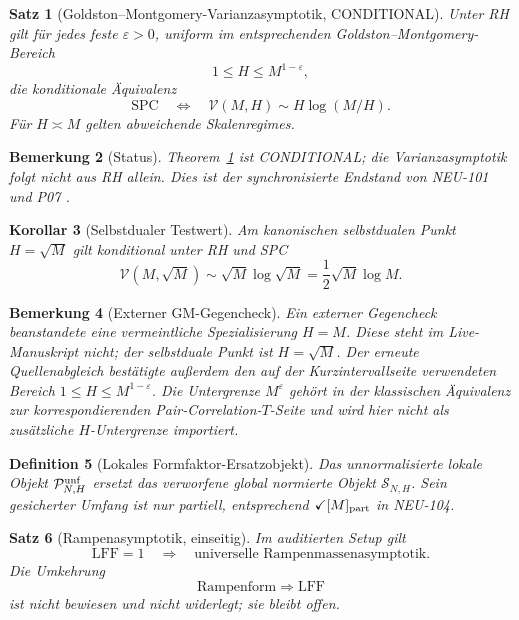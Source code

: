 \documentclass[11pt,a4paper]{amsart}
\newtheorem{theorem}{Satz}[section]
\newtheorem{corollary}[theorem]{Korollar}
\newtheorem{definition}[theorem]{Definition}
\newtheorem{remark}[theorem]{Bemerkung}
\newcommand{\SPC}{\mathrm{SPC}}
\newcommand{\LFF}{\mathrm{LFF}}
\begin{document}
\begin{theorem}[Goldston--Montgomery-Varianzasymptotik, CONDITIONAL]
\label{thm:gm}
Unter RH gilt für jedes feste $\varepsilon>0$, uniform im entsprechenden
Goldston--Montgomery-Bereich
\[
  1\le H\le M^{1-\varepsilon},
\]
die konditionale Äquivalenz
\[
  \SPC
  \quad\Longleftrightarrow\quad
  \mathcal V(M,H)\sim H\log(M/H).
\]
Für $H\asymp M$ gelten abweichende Skalenregimes.
\end{theorem}

\begin{remark}[Status]
Theorem~\ref{thm:gm} ist \emph{CONDITIONAL}; die Varianzasymptotik folgt nicht
aus RH allein. Dies ist der synchronisierte Endstand von NEU-101 und P07
\cite{GoldstonMontgomery1987}.
\end{remark}

\begin{corollary}[Selbstdualer Testwert]\label{cor:self-dual}
Am kanonischen selbstdualen Punkt $H=\sqrt M$ gilt konditional unter RH und SPC
\[
  \mathcal V(M,\sqrt M)
  \sim \sqrt M\log\sqrt M
  =\frac12\sqrt M\log M.
\]
\end{corollary}

\begin{remark}[Externer GM-Gegencheck]\label{rem:external-gm}
Ein externer Gegencheck beanstandete eine vermeintliche Spezialisierung
$H=M$. Diese steht im Live-Manuskript nicht; der selbstduale Punkt ist
$H=\sqrt M$. Der erneute Quellenabgleich bestätigte außerdem den auf der
Kurzintervallseite verwendeten Bereich $1\le H\le M^{1-\varepsilon}$.
Die Untergrenze $M^\varepsilon$ gehört in der klassischen Äquivalenz zur
korrespondierenden Pair-Correlation-$T$-Seite und wird hier nicht als
zusätzliche $H$-Untergrenze importiert.
\end{remark}

\begin{definition}[Lokales Formfaktor-Ersatzobjekt]\label{def:local-form-factor}
Das unnormalisierte lokale Objekt $\mathcal P^{\rm unf}_{N,H}$ ersetzt das
verworfene global normierte Objekt $\mathcal S_{N,H}$. Sein gesicherter Umfang
ist nur partiell, entsprechend $\checkmark[M]_{\rm part}$ in NEU-104.
\end{definition}

\begin{theorem}[Rampenasymptotik, einseitig]\label{thm:ramp-one-way}
Im auditierten Setup gilt
\[
  \LFF=1
  \quad\Longrightarrow\quad
  \text{universelle Rampenmassenasymptotik}.
\]
Die Umkehrung
\[
  \text{Rampenform}\Longrightarrow\LFF
\]
ist nicht bewiesen und nicht widerlegt; sie bleibt offen.
\end{theorem}
\end{document}
